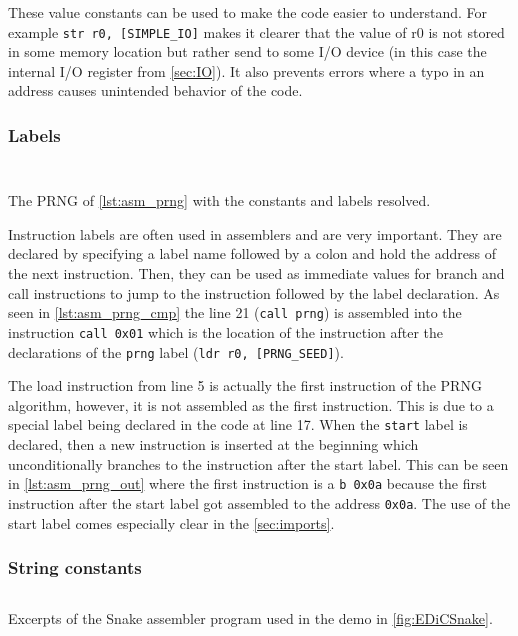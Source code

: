 These value constants can be used to make the code easier to understand.
For example \texttt{str r0, [SIMPLE_IO]} makes it clearer that the value of r0 is not stored in some memory location but rather send to some I/O device (in this case the internal I/O register from \cref{sec:IO}).
It also prevents errors where a typo in an address causes unintended behavior of the code.

\subsubsection{Labels}
\begin{listing}[t]
  \begin{multicols}{2}
    \inputminted[linenos,
      breaklines,
      frame=leftline,
      xleftmargin=20pt,
    ]{ARM}{src/prng.s}
    \inputminted[breaklines, frame=leftline]{ARM}{src/prng_cmp.s}

  \end{multicols}
  \caption{The \gls{PRNG} of \cref{lst:asm_prng} with the constants and labels resolved.}
  \label{lst:asm_prng_cmp}
\end{listing}
Instruction labels are often used in assemblers and are very important.
They are declared by specifying a label name followed by a colon and hold the address of the next instruction.
Then, they can be used as immediate values for branch and call instructions to jump to the instruction followed by the label declaration.
As seen in \cref{lst:asm_prng_cmp} the line 21 (\texttt{call prng}) is assembled into the instruction \texttt{call 0x01} which is the location of the instruction after the declarations of the \texttt{prng} label (\texttt{ldr r0, [PRNG_SEED]}).

The load instruction from line 5 is actually the first instruction of the \gls{PRNG} algorithm, however, it is not assembled as the first instruction.
This is due to a special label being declared in the code at line 17.
When the \texttt{start} label is declared, then a new instruction is inserted at the beginning which unconditionally branches to the instruction after the start label.
This can be seen in \cref{lst:asm_prng_out} where the first instruction is a \texttt{b 0x0a} because the first instruction after the start label got assembled to the address \texttt{0x0a}.
The use of the start label comes especially clear in the \cref{sec:imports}.

\subsubsection{String constants}
\begin{listing}[t]
  \inputminted[linenos,
    breaklines,
    frame=leftline,
    xleftmargin=20pt,
  ]{ARM}{src/snake_excerpt.s}
  \caption{Excerpts of the Snake assembler program used in the demo in \cref{fig:EDiCSnake}.}
  \label{lst:asm_snake_excerpt}
\end{listing}


